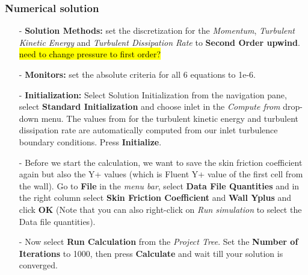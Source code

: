 \documentclass[11pt,a4paper,oneside]{scrartcl}
\newcommand\bfr[1]{\textcolor[rgb]{1,0.00,0.00}{\textbf{\textsf{#1}}}}
\begin{document}
\subsubsection{Numerical solution}

\begin{itemize}
    \item[-] \textbf{Solution Methods:} set the discretization for the \emph{Momentum}, \emph{Turbulent Kinetic Energy} and \emph{Turbulent Dissipation Rate} to \bfr{Second Order upwind}. \hl{need to change pressure to first order?}
    \item[-] \textbf{Monitors:} set the absolute criteria for all 6 equations to 1e-6.
    \item[-] \textbf{Initialization:} Select Solution Initialization from the navigation pane, select \bfr{Standard Initialization} and choose inlet in the \emph{Compute from} drop-down menu. The values from for the turbulent kinetic energy and turbulent dissipation rate are automatically computed from our inlet turbulence boundary conditions. Press \bfr{Initialize}.
    \item[-] Before we start the calculation, we want to save the skin friction coefficient again but also the Y+ values (which is Fluent Y+ value of the first cell from the wall). Go to \bfr{File} in the \emph{menu bar}, select \bfr{Data File Quantities} and in the right column select \bfr{Skin Friction Coefficient} and \bfr{Wall Yplus} and click \bfr{OK} (Note that you can also right-click on \emph{Run simulation} to select the Data file quantities).
    \item[-] Now select \bfr{Run Calculation} from the \emph{Project Tree}. Set the \bfr{Number of Iterations} to 1000, then press \bfr{Calculate} and wait till your solution is converged.
\end{itemize}
\end{document}
